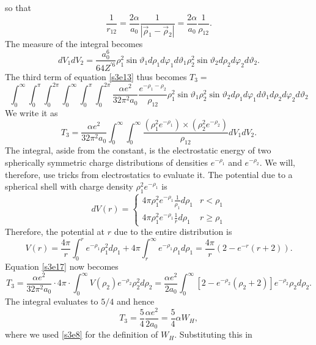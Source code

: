 \documentclass{article}
\numberwithin{equation}{section}
\begin{document}
so that
\begin{equation}\label{s3e14}
\frac{1}{r_{12}} = \frac{2\alpha}{a_0}\frac{1}{|\vec{\rho}_1 - 
\vec{\rho}_2|} = \frac{2\alpha}{a_0}\frac{1}{\rho_{12}}.
\end{equation}
The measure of the integral becomes
\begin{equation}\label{s3e15}
dV_1 dV_2 = \frac{a_0^6}{64 Z^{\prime 6}}\rho_1^2\sin\vartheta_1d\rho_1 
d\varphi_1 d\vartheta_1\rho_2^2\sin\vartheta_2d\rho_2 d\varphi_2 
d\vartheta_2.
\end{equation}
The third term of equation \eqref{s3e13} thus becomes $T_3 = $
\begin{equation}\label{s3e16}
\int_0^\infty\int_0^\pi\int_0^{2\pi}\int_0^\infty\int_0^\pi\int_0^{2\pi}
\frac{\alpha e^2}{32\pi^2 a_0}\frac{e^{-\rho_1 - \rho_2}}{\rho_{12}}
\rho_1^2\sin\vartheta_1\rho_2^2\sin\vartheta_2 
d\rho_1d\varphi_1d\vartheta_1 d\rho_2d\varphi_2d\vartheta_2
\end{equation}
We write it as
\begin{equation}\label{s3e17}
T_3 = \frac{\alpha e^2}{32\pi^2 a_0}\int_0^\infty\int_0^\infty 
\frac{(\rho_1^2e^{-\rho_1}) \times (\rho_2^2e^{-\rho_2})}
{\rho_{12}}dV_1 dV_2.
\end{equation}
The integral, aside from the constant, is the electrostatic energy of two
spherically symmetric charge distributions of densities $e^{-\rho_1}$ and
$e^{-\rho_2}$. We will, therefore, use tricks from electrostatics to 
evaluate it. The potential due to a spherical shell with charge density 
$\rho_1^2e^{-\rho_1}$ is
\[
dV(r) = \begin{cases}
4\pi\rho_1^2e^{-\rho_1}\frac{1}{\rho_1}d\rho_1 & r < \rho_1 \\
4\pi\rho_1^2e^{-\rho_1}\frac{1}{r}d\rho_1      & r \ge \rho_1
\end{cases}
\]
Therefore, the potential at $r$ due to the entire distribution is
\[
V(r) = \frac{4\pi}{r}\int_0^re^{-\rho_1}\rho_1^2d\rho_1 + 
4\pi\int_r^\infty e^{-\rho_1}\rho_1d\rho_1 = 
\frac{4\pi}{r}(2 - e^{-r}(r + 2)).
\]
Equation \eqref{s3e17} now becomes
\[
T_3 = \frac{\alpha e^2}{32\pi^2 a_0}\cdot 4\pi\cdot\int_0^\infty 
V(\rho_2)e^{-\rho_2}\rho_2^2d\rho_2
= \frac{\alpha e^2}{2a_0}\int_0^\infty 
[2 - e^{-\rho_2}(\rho_2 +2)]e^{-\rho_2}\rho_2d\rho_2.
\]
The integral evaluates to $5/4$ and hence
\begin{equation}\label{s3e18}
T_3 = \frac{5}{4}\frac{\alpha e^2}{2a_0} = \frac{5}{4}\alpha W_H,
\end{equation}
where we used \eqref{s3e8} for the definition of $W_H$. Substituting this in
\end{document}
